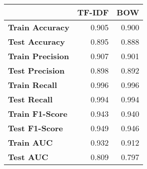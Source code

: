 \begin{tabular}{lrr}
\toprule
{} &  TF-IDF &   BOW \\
\midrule
\textbf{Train Accuracy } &   0.905 & 0.900 \\
\textbf{Test Accuracy  } &   0.895 & 0.888 \\
\textbf{Train Precision} &   0.907 & 0.901 \\
\textbf{Test Precision } &   0.898 & 0.892 \\
\textbf{Train Recall   } &   0.996 & 0.996 \\
\textbf{Test Recall    } &   0.994 & 0.994 \\
\textbf{Train F1-Score } &   0.943 & 0.940 \\
\textbf{Test F1-Score  } &   0.949 & 0.946 \\
\textbf{Train AUC      } &   0.932 & 0.912 \\
\textbf{Test AUC       } &   0.809 & 0.797 \\
\bottomrule
\end{tabular}
